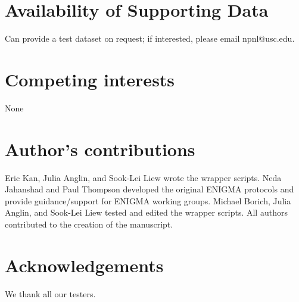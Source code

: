 \documentclass[twocolumn]{bmcart}%
\begin{document}

\begin{backmatter}

\section*{Availability of Supporting Data}
Can provide a test dataset on request; if interested, please email npnl@usc.edu.

\section*{Competing interests}
None

\section*{Author's contributions}
Eric Kan, Julia Anglin, and Sook-Lei Liew wrote the wrapper scripts. Neda Jahanshad and Paul Thompson developed the original ENIGMA protocols and provide guidance/support for ENIGMA working groups. Michael Borich, Julia Anglin, and Sook-Lei Liew tested and edited the wrapper scripts. All authors contributed to the creation of the manuscript.

\section*{Acknowledgements}
We thank all our testers.

  
  


\end{backmatter}
\end{document}
